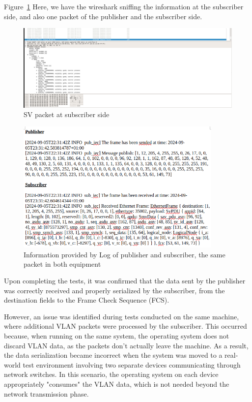 Figure~\ref{fig:subscriber_side} Here, we have the wireshark sniffing the information at the subscriber side, and also one packet of the publisher and the subscriber side.

\begin{figure}[tbh]
	\centering
	\includegraphics[width=1.00\textwidth, keepaspectratio]{ch6/assets/subscriber_side.png} %
	\caption{SV packet at subscriber side}
	\label{fig:subscriber_side}
\end{figure}
\FloatBarrier

\begin{figure}[tbh]
	\centering
	\includegraphics[width=0.90\textwidth, keepaspectratio]{ch6/assets/information_packet_sub_pub.png} %
	\caption{Information provided by Log of publisher and subscriber, the same packet in both equipment}
	\label{fig:information_packet_sub_pub}
\end{figure}
\FloatBarrier

Upon completing the tests, it was confirmed that the data sent by the publisher was correctly received and properly serialized by the subscriber, from the destination fields to the Frame Check Sequence (FCS).

However, an issue was identified during tests conducted on the same machine, where additional VLAN packets were processed by the subscriber. This occurred because, when running on the same system, the operating system does not discard VLAN data, as the packets don’t actually leave the machine. As a result, the data serialization became incorrect when the system was moved to a real-world test environment involving two separate devices communicating through network switches. In this scenario, the operating system on each device appropriately "consumes" the VLAN data, which is not needed beyond the network transmission phase.

